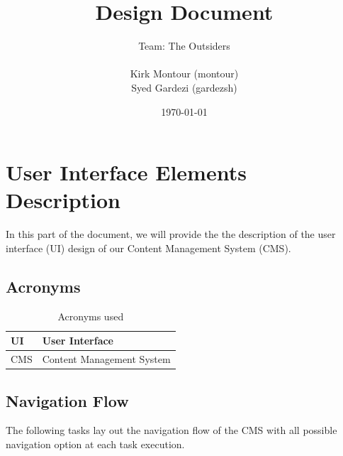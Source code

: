 \documentclass[12pt]{article}
\begin{document}
\title{Design Document} 
\author{Team: The Outsiders\\ \\ Kirk Montour (montour)\\ Syed Gardezi (gardezsh)}
\date{\today}
  
\maketitle

\pagebreak

\tableofcontents

\pagebreak

\listoffigures

\section{User Interface Elements Description}
In this part of the document, we will provide the the description of the user interface (UI) design of our Content Management System (CMS).

\subsection{Acronyms}

\begin{table}[h]
\centering
\caption{Acronyms used}
\label{my-label}
\begin{tabular}{|l|l|}
\hline
UI  & User Interface            \\ \hline
CMS & Content Management System \\ \hline
\end{tabular}
\end{table}


\subsection{Navigation Flow}
The following tasks lay out the navigation flow of the CMS with all possible navigation option at each task execution.
\end{document}
